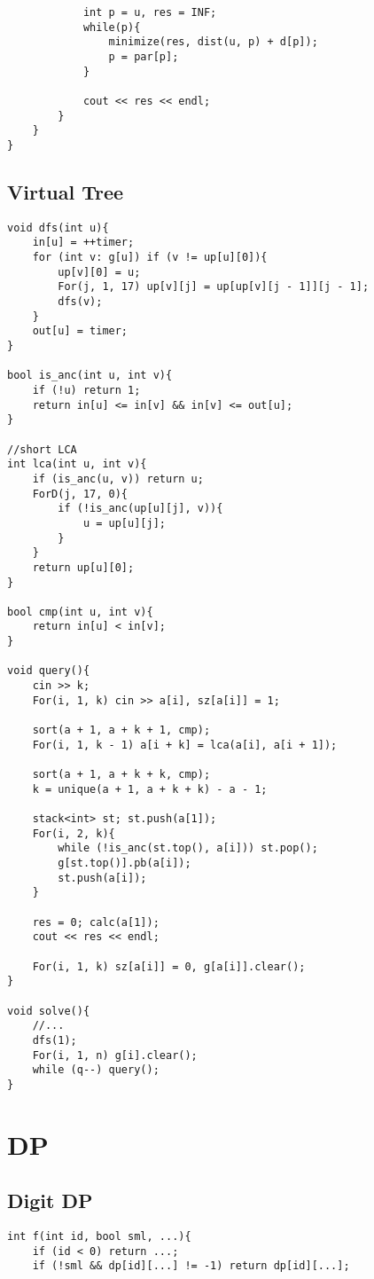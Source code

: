 \documentclass[11pt,a4paper]{article}
\begin{document}
\begin{multicols*}{2}
\begin{lstlisting}
			int p = u, res = INF;
			while(p){
				minimize(res, dist(u, p) + d[p]);
				p = par[p];
			}
			
			cout << res << endl;
		}
	}
}
\end{lstlisting}

\subsection{Virtual Tree}
\begin{lstlisting}
void dfs(int u){
	in[u] = ++timer;
	for (int v: g[u]) if (v != up[u][0]){
		up[v][0] = u;
		For(j, 1, 17) up[v][j] = up[up[v][j - 1]][j - 1];
		dfs(v);
	}
	out[u] = timer;
}
 
bool is_anc(int u, int v){
	if (!u) return 1;
	return in[u] <= in[v] && in[v] <= out[u];
}

//short LCA
int lca(int u, int v){
	if (is_anc(u, v)) return u;
	ForD(j, 17, 0){
        if (!is_anc(up[u][j], v)){
            u = up[u][j];
        }
    }
	return up[u][0];
}
 
bool cmp(int u, int v){
	return in[u] < in[v];
}

void query(){
	cin >> k;
	For(i, 1, k) cin >> a[i], sz[a[i]] = 1;
	
	sort(a + 1, a + k + 1, cmp);
	For(i, 1, k - 1) a[i + k] = lca(a[i], a[i + 1]);
	
	sort(a + 1, a + k + k, cmp);
	k = unique(a + 1, a + k + k) - a - 1;
	
	stack<int> st; st.push(a[1]);
	For(i, 2, k){
		while (!is_anc(st.top(), a[i])) st.pop();
		g[st.top()].pb(a[i]);
		st.push(a[i]);
	}
	
	res = 0; calc(a[1]);
	cout << res << endl;
	
	For(i, 1, k) sz[a[i]] = 0, g[a[i]].clear();
}

void solve(){
	//...	
	dfs(1);
	For(i, 1, n) g[i].clear();
	while (q--) query();
}
\end{lstlisting}

\section {DP}
\subsection{Digit DP}
\begin{lstlisting}
int f(int id, bool sml, ...){
    if (id < 0) return ...;
    if (!sml && dp[id][...] != -1) return dp[id][...];


\end{lstlisting}
\end{multicols*}
\end{document}
